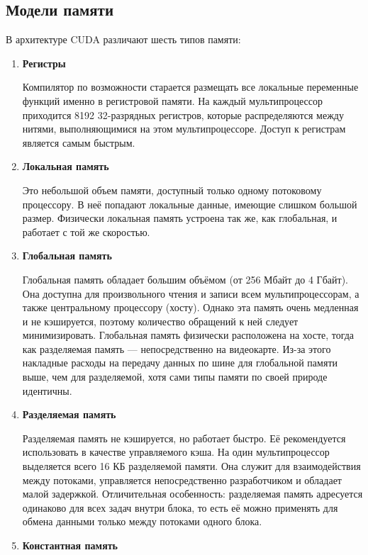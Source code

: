 \documentclass{article}[14pt]
\begin{document}
\subsection{Модели памяти}

В архитектуре CUDA различают шесть типов памяти:

\begin{enumerate}
\item \textbf{Регистры}

Компилятор по возможности старается размещать все локальные переменные функций именно в регистровой памяти. На каждый мультипроцессор 
приходится 8192 32-разрядных регистров, которые распределяются между нитями, выполняющимися на этом мультипроцессоре. Доступ к 
регистрам является самым быстрым.

\item \textbf{Локальная память}

Это небольшой объем памяти, доступный только одному потоковому процессору. В неё попадают локальные данные, имеющие слишком большой размер. 
Физически локальная память устроена так же, как глобальная, и работает с той же скоростью.

\item \textbf{Глобальная память}

Глобальная память обладает большим объёмом (от 256 Мбайт до 4 Гбайт). Она доступна для произвольного чтения и записи всем мультипроцессорам, 
а также центральному процессору (хосту). Однако эта память очень медленная и не кэшируется, поэтому количество обращений к ней следует 
минимизировать. Глобальная память физически расположена на хосте, тогда как разделяемая память — непосредственно на видеокарте. 
Из-за этого накладные расходы на передачу данных по шине для глобальной памяти выше, чем для разделяемой, хотя сами типы памяти по своей 
природе идентичны.

\item \textbf{Разделяемая память}

Разделяемая память не кэшируется, но работает быстро. Её рекомендуется использовать в качестве управляемого кэша. На один мультипроцессор 
выделяется всего 16 КБ разделяемой памяти. Она служит для взаимодействия между потоками, управляется непосредственно разработчиком и обладает 
малой задержкой. Отличительная особенность: разделяемая память адресуется одинаково для всех задач внутри блока, то есть её можно применять 
для обмена данными только между потоками одного блока.

\item \textbf{Константная память}


\end{enumerate}
\end{document}
